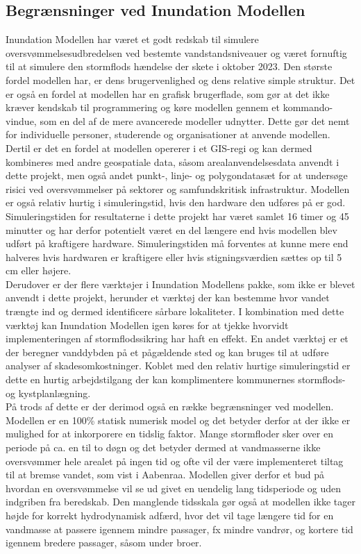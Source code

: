 \subsection{Begrænsninger ved Inundation Modellen}
Inundation Modellen har været et godt redskab til simulere oversvømmelsesudbredelsen ved bestemte vandstandsniveauer og været fornuftig til at simulere den stormflods hændelse der skete i oktober 2023. 
Den største fordel modellen har, er dens brugervenlighed og dens relative simple struktur. Det er også en fordel at modellen har en grafisk brugerflade, som gør at det ikke kræver kendskab til programmering og køre modellen gennem et kommando-vindue, som en del af de mere avancerede modeller udnytter. Dette gør det nemt for individuelle personer, studerende og organisationer at anvende modellen. Dertil er det en fordel at modellen opererer i et GIS-regi og kan dermed kombineres med andre geospatiale data, såsom arealanvendelsesdata anvendt i dette projekt, men også andet punkt-, linje- og polygondatasæt for at undersøge risici ved oversvømmelser på sektorer og samfundskritisk infrastruktur. Modellen er også relativ hurtig i simuleringstid, hvis den hardware den udføres på er god. Simuleringstiden for resultaterne i dette projekt har været samlet 16 timer og 45 minutter og har derfor potentielt været en del længere end hvis modellen blev udført på kraftigere hardware. Simuleringstiden må forventes at kunne mere end halveres hvis hardwaren er kraftigere eller hvis stigningsværdien sættes op til 5 cm eller højere.\\

Derudover er der flere værktøjer i Inundation Modellens pakke, som ikke er blevet anvendt i dette projekt, herunder et værktøj der kan bestemme hvor vandet trængte ind og dermed identificere sårbare lokaliteter. I kombination med dette værktøj kan Inundation Modellen igen køres for at tjekke hvorvidt implementeringen af stormflodssikring har haft en effekt. En andet værktøj er et der beregner vanddybden på et pågældende sted og kan bruges til at udføre analyser af skadesomkostninger. Koblet med den relativ hurtige simuleringstid er dette en hurtig arbejdstilgang der kan komplimentere kommunernes stormflods- og kystplanlægning.\\

På trods af dette er der derimod også en række begrænsninger ved modellen. Modellen er en 100\% statisk numerisk model og det betyder derfor at der ikke er mulighed for at inkorporere en tidslig faktor. Mange stormfloder sker over en periode på ca. en til to døgn og det betyder dermed at vandmasserne ikke oversvømmer hele arealet på ingen tid og ofte vil der være implementeret tiltag til at bremse vandet, som vist i Aabenraa. Modellen giver derfor et bud på hvordan en oversvømmelse vil se ud givet en uendelig lang tidsperiode og uden indgriben fra beredskab. Den manglende tidsskala gør også at modellen ikke tager højde for korrekt hydrodynamisk adfærd, hvor det vil tage længere tid for en vandmasse at passere igennem mindre passager, fx mindre vandrør, og kortere tid igennem bredere passager, såsom under broer.\\

